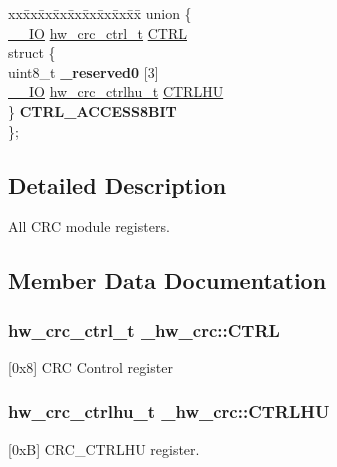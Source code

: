 \begin{DoxyCompactItemize}
\begin{tabbing}
\end{tabbing}\item 
\begin{tabbing}
xx\=xx\=xx\=xx\=xx\=xx\=xx\=xx\=xx\=\kill
union \{\\
\>\hyperlink{core__sc300_8h_aec43007d9998a0a0e01faede4133d6be}{\_\_IO} \hyperlink{union__hw__crc__ctrl}{hw\_crc\_ctrl\_t} \hyperlink{struct__hw__crc_aab5eb8f5c925b3e04678cec39d47f4c3}{CTRL}\\
\>struct \{\\
\>\>uint8\_t {\bfseries \_reserved0} \mbox{[}3\mbox{]}\\
\>\>\hyperlink{core__sc300_8h_aec43007d9998a0a0e01faede4133d6be}{\_\_IO} \hyperlink{union__hw__crc__ctrlhu}{hw\_crc\_ctrlhu\_t} \hyperlink{struct__hw__crc_afced4af714ad58ecd291166cada587fc}{CTRLHU}\\
\>\} {\bfseries CTRL\_ACCESS8BIT}\\
\}; \hypertarget{struct__hw__crc_a179522097f6e32babfddaaa1395227f5}{}\label{struct__hw__crc_a179522097f6e32babfddaaa1395227f5}
\\

\end{tabbing}\end{DoxyCompactItemize}


\subsection{Detailed Description}
All C\+RC module registers. 

\subsection{Member Data Documentation}
\subsubsection[{\texorpdfstring{C\+T\+RL}{CTRL}}]{ {\bf hw\+\_\+crc\+\_\+ctrl\+\_\+t} \+\_\+hw\+\_\+crc\+::\+C\+T\+RL}\hypertarget{struct__hw__crc_aab5eb8f5c925b3e04678cec39d47f4c3}{}\label{struct__hw__crc_aab5eb8f5c925b3e04678cec39d47f4c3}
\mbox{[}0x8\mbox{]} C\+RC Control register 
\subsubsection[{\texorpdfstring{C\+T\+R\+L\+HU}{CTRLHU}}]{ {\bf hw\+\_\+crc\+\_\+ctrlhu\+\_\+t} \+\_\+hw\+\_\+crc\+::\+C\+T\+R\+L\+HU}\hypertarget{struct__hw__crc_afced4af714ad58ecd291166cada587fc}{}\label{struct__hw__crc_afced4af714ad58ecd291166cada587fc}
\mbox{[}0xB\mbox{]} C\+R\+C\+\_\+\+C\+T\+R\+L\+HU register. 

